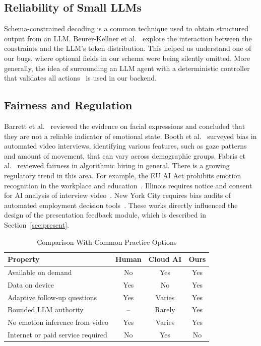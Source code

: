 \documentclass[conference]{IEEEtran}
\begin{document}
\subsection{Reliability of Small LLMs}
Schema-constrained decoding is a common technique used to obtain structured output from an LLM. Beurer-Kellner et al.~\cite{beurer2024} explore the interaction between the constraints and the LLM's token distribution. This helped us understand one of our bugs, where optional fields in our schema were being silently omitted. More generally, the idea of surrounding an LLM agent with a deterministic controller that validates all actions~\cite{madatha2026} is used in our backend.

\subsection{Fairness and Regulation}
Barrett et al.~\cite{barrett2019} reviewed the evidence on facial expressions and concluded that they are not a reliable indicator of emotional state. Booth et al.~\cite{booth2023} surveyed bias in automated video interviews, identifying various features, such as gaze patterns and amount of movement, that can vary across demographic groups. Fabris et al.~\cite{fabris2023} reviewed fairness in algorithmic hiring in general. There is a growing regulatory trend in this area. For example, the EU AI Act prohibits emotion recognition in the workplace and education~\cite{euaiact}. Illinois requires notice and consent for AI analysis of interview video~\cite{illinois}. New York City requires bias audits of automated employment decision tools~\cite{nyc144}. These works directly influenced the design of the presentation feedback module, which is described in Section~\ref{sec:present}.

\begin{table}[t]
\caption{Comparison With Common Practice Options}
\label{tab:compare}
\centering
\footnotesize
\renewcommand{\arraystretch}{1.3}
\begin{tabular}{|l|c|c|c|}
\hline
\textbf{Property} & \textbf{Human} & \textbf{Cloud AI} & \textbf{Ours} \\
\hline
Available on demand & No & Yes & Yes \\
Data on device & Yes & No & Yes \\
Adaptive follow-up questions & Yes & Varies & Yes \\
Bounded LLM authority & -- & Rarely & Yes \\
No emotion inference from video & Yes & Varies & Yes \\
Internet or paid service required & No & Yes & No \\
\hline
\end{tabular}
\end{table}
\end{document}
